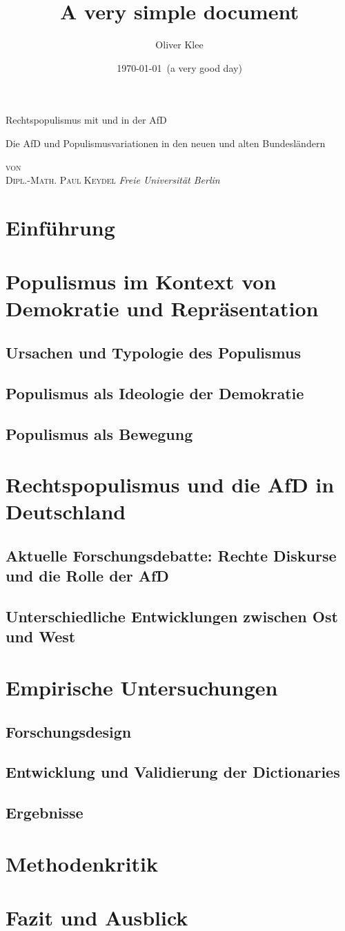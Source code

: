 \documentclass[a4paper]{scrreprt}
\title{A very simple document}
\author{Oliver Klee}
\date{\today\ (a very good day)}
\begin{document}
\begin{titlepage}
\centering
\vspace{4\baselineskip}
{\Huge Rechtspopulismus mit und in der AfD\par}
\vspace{2\baselineskip}
{\Large Die AfD und Populismusvariationen in den neuen und alten Bundesländern\par}
\vspace{4\baselineskip}
{\large\textsc{von\\[.5em]Dipl.-Math. Paul Keydel}}
\vfill
{\em Freie Universität Berlin}
\end{titlepage}

\tableofcontents

\chapter{Einführung}
\chapter{Populismus im Kontext von Demokratie und Repräsentation}
\section{Ursachen und Typologie des Populismus}
\section{Populismus als Ideologie der Demokratie}
\section{Populismus als Bewegung}
\chapter{Rechtspopulismus und die AfD in Deutschland}
\section{Aktuelle Forschungsdebatte: Rechte Diskurse und die Rolle der AfD}
\section{Unterschiedliche Entwicklungen zwischen Ost und West}
\chapter{Empirische Untersuchungen}
\section{Forschungsdesign}
\section{Entwicklung und Validierung der Dictionaries}
\section{Ergebnisse}
\chapter{Methodenkritik}
\chapter{Fazit und Ausblick}
\end{document}
